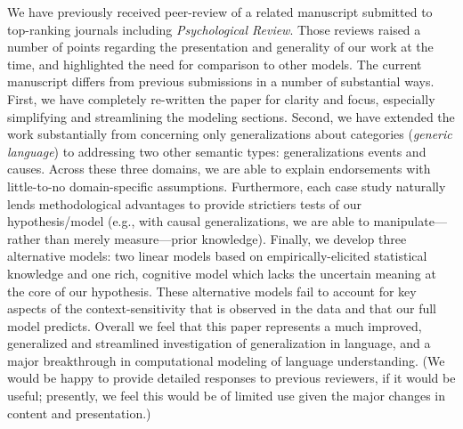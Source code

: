 \documentclass[11pt,letterpaper]{letter} %
\begin{document}
\begin{letter}
We have previously received peer-review of a related manuscript submitted to top-ranking journals including \emph{Psychological Review}.
Those reviews raised a number of points regarding the presentation and generality of our work at the time, and highlighted the need for comparison to other models. 
The current manuscript differs from previous submissions in a number of substantial ways.
First, we have completely re-written the paper for clarity and focus, especially simplifying and streamlining the modeling sections.
Second, we have extended the work substantially from concerning only generalizations about categories (\emph{generic language}) to addressing two other semantic types: generalizations events and causes.
Across these three domains, we are able to explain endorsements with little-to-no domain-specific assumptions. 
Furthermore, each case study naturally lends methodological advantages to provide strictiers tests of our hypothesis/model (e.g., with causal generalizations, we are able to manipulate---rather than merely measure---prior knowledge).
Finally, we develop three alternative models: two linear models based on empirically-elicited statistical knowledge and one rich, cognitive model which lacks the uncertain meaning at the core of our hypothesis. 
These alternative models fail to account for key aspects of the context-sensitivity that is observed in the data and that our full model predicts.
Overall we feel that this paper represents a much improved, generalized and streamlined investigation of generalization in language, and a major breakthrough in computational modeling of language understanding.
(We would be happy to provide detailed responses to previous reviewers, if it would be useful; presently, we feel this would be of limited use given the major changes in content and presentation.)




\end{letter}
\end{document}
